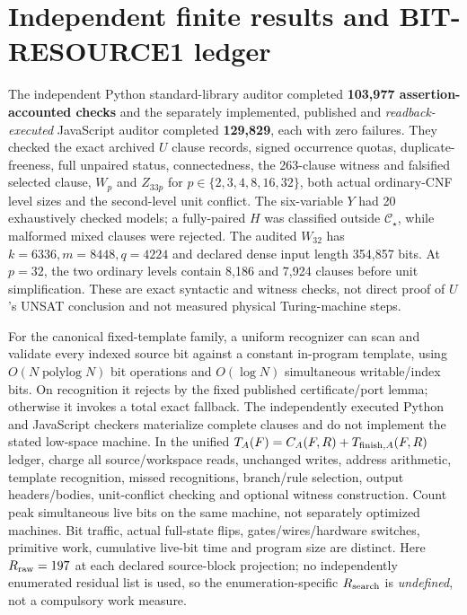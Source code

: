 \documentclass[11pt]{article}
\newcommand{\CS}{\mathcal C_\star}
\begin{document}
\section{Independent finite results and BIT-RESOURCE1 ledger}
The independent Python standard-library auditor completed \textbf{103,977 assertion-accounted checks} and the separately implemented, published and \emph{readback-executed} JavaScript auditor completed \textbf{129,829}, each with zero failures. They checked the exact archived \(U\) clause records, signed occurrence quotas, duplicate-freeness, full unpaired status, connectedness, the 263-clause witness and falsified selected clause, \(W_p\) and \(Z_{33p}\) for \(p\in\{2,3,4,8,16,32\}\), both actual ordinary-CNF level sizes and the second-level unit conflict. The six-variable \(Y\) had 20 exhaustively checked models; a fully-paired \(H\) was classified outside \(\CS\), while malformed mixed clauses were rejected. The audited \(W_{32}\) has \(k=6336,m=8448,q=4224\) and declared dense input length 354,857 bits. At \(p=32\), the two ordinary levels contain 8,186 and 7,924 clauses before unit simplification. These are exact syntactic and witness checks, not direct proof of \(U\)'s UNSAT conclusion and not measured physical Turing-machine steps.

For the canonical fixed-template family, a uniform recognizer can scan and validate every indexed source bit against a constant in-program template, using \(O(N\operatorname{polylog}N)\) bit operations and \(O(\log N)\) simultaneous writable/index bits. On recognition it rejects by the fixed published certificate/port lemma; otherwise it invokes a total exact fallback. The independently executed Python and JavaScript checkers materialize complete clauses and do not implement the stated low-space machine. In the unified \(T_A(F)=C_A(F,R)+T_{{\rm finish},A}(F,R)\) ledger, charge all source/workspace reads, unchanged writes, address arithmetic, template recognition, missed recognitions, branch/rule selection, output headers/bodies, unit-conflict checking and optional witness construction. Count peak simultaneous live bits on the same machine, not separately optimized machines. Bit traffic, actual full-state flips, gates/wires/hardware switches, primitive work, cumulative live-bit time and program size are distinct. Here \(R_{\rm raw}=197\) at each declared source-block projection; no independently enumerated residual list is used, so the enumeration-specific \(R_{\rm search}\) is \emph{undefined}, not a compulsory work measure.
\end{document}
